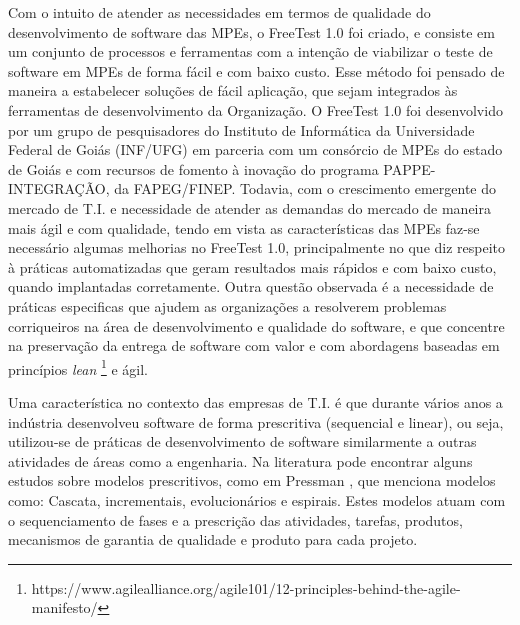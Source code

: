 Com o intuito de atender as necessidades em termos de qualidade do desenvolvimento de software das MPEs, o FreeTest 1.0 \cite{Camilo-junior2012} foi criado, e consiste em um conjunto de processos e ferramentas com a intenção de viabilizar o teste de software em MPEs de forma fácil e com baixo custo. Esse método foi pensado de maneira a estabelecer soluções de fácil aplicação, que sejam integrados às ferramentas de desenvolvimento da Organização. O FreeTest 1.0 foi desenvolvido por um grupo de pesquisadores do Instituto de Informática da Universidade Federal de Goiás (INF/UFG) \cite{Camilo-junior2012} em parceria com um consórcio de MPEs do estado de Goiás e com recursos de fomento à inovação do programa PAPPE-INTEGRAÇÃO, da FAPEG/FINEP. Todavia, com o crescimento emergente do mercado de T.I. e necessidade de atender as demandas do mercado de maneira mais ágil e com qualidade, tendo em vista as características das MPEs faz-se necessário algumas melhorias no FreeTest 1.0, principalmente no que diz respeito à práticas automatizadas que geram resultados mais rápidos e com baixo custo, quando implantadas corretamente. Outra questão observada é a necessidade de práticas especificas que ajudem as organizações a resolverem problemas corriqueiros na área de desenvolvimento e qualidade do software, e que concentre na preservação da entrega de software com valor e com abordagens baseadas em princípios \textit{lean} \footnote{https://www.agilealliance.org/agile101/12-principles-behind-the-agile-manifesto/} e ágil.

Uma característica no contexto das empresas de T.I. é que durante vários anos a indústria desenvolveu software de forma prescritiva (sequencial e linear), ou seja, utilizou-se de práticas de desenvolvimento de software similarmente a outras atividades de áreas como a engenharia. Na literatura pode encontrar alguns estudos sobre modelos prescritivos, como em Pressman \cite{PRESSMAN2011}, que menciona modelos como: Cascata, incrementais, evolucionários e espirais. Estes modelos atuam com o sequenciamento de fases e a prescrição das atividades, tarefas, produtos, mecanismos de garantia de qualidade e produto para cada projeto. 

